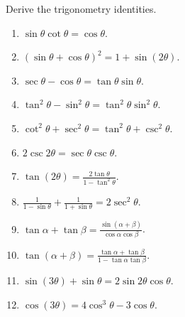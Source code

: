 Derive the trigonometry identities.
\begin{multicols}{3}
\begin{enumerate}
\item $\sin \theta\cot \theta =\cos \theta$.
\item $(\sin \theta +\cos \theta)^2=1+\sin(2\theta)$.
\item $\sec \theta - \cos \theta= \tan \theta \sin \theta$.
\item $\tan^2 \theta-\sin^2 \theta=\tan^2\theta\sin^2\theta$.
\item $\cot^2\theta+\sec^2\theta=\tan^2\theta+\csc^2\theta$.
\item $2\csc 2\theta= \sec \theta \csc \theta$.
\item $\tan (2\theta) =\frac{2\tan \theta}{1-\tan^2\theta} $.
\item $\frac{1}{1-\sin \theta}+ \frac{1}{1+\sin \theta}=2\sec^2\theta$.
\item $\tan \alpha + \tan \beta = \frac{\sin (\alpha+\beta)}{\cos \alpha \cos \beta}$.
\item $\tan (\alpha+\beta)= \frac{\tan \alpha +\tan \beta}{1-\tan \alpha\tan \beta}$.
\item $\sin (3\theta) +\sin \theta = 2 \sin 2\theta \cos \theta $.
\item $\cos (3\theta) = 4\cos^3\theta-3\cos \theta $.
\end{enumerate} 
\end{multicols}
